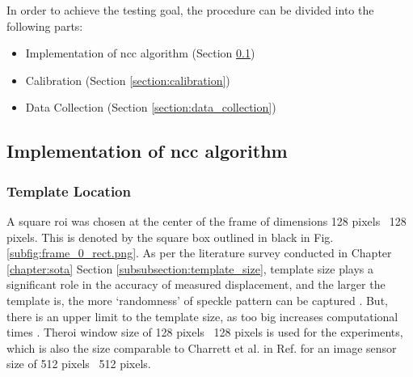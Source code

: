 In order to achieve the testing goal, the procedure can be divided into the following parts:

\begin{itemize}
    \item Implementation of \gls{ncc} algorithm (Section \ref{section:code_logic})
    \item Calibration (Section \ref{section:calibration})
    \item Data Collection (Section \ref{section:data_collection})
\end{itemize}





\subsection{Implementation of \gls{ncc} algorithm}\label{section:code_logic}
    \subsubsection*{Template Location}
        A square \gls{roi} was chosen at the center of the frame of dimensions 128 pixels \times \ 128 pixels. This is denoted by the square box outlined in black in Fig. \ref{subfig:frame_0_rect.png}. As per the literature survey conducted in Chapter \ref{chapter:sota} Section \ref{subsubsection:template_size}, template size plays a significant role in the accuracy of measured displacement, and the larger the template is, the more `randomness' of speckle pattern can be captured \cite{pan_subset}. But, there is an upper limit to the template size, as too big increases computational times \cite{yaofeng}. The\gls{roi} window size of 128 pixels \times \ 128 pixels is used for the experiments, which is also the size comparable to Charrett et al. in Ref. \cite{charrett_2018} for an image sensor size of 512 pixels \times \ 512 pixels.

